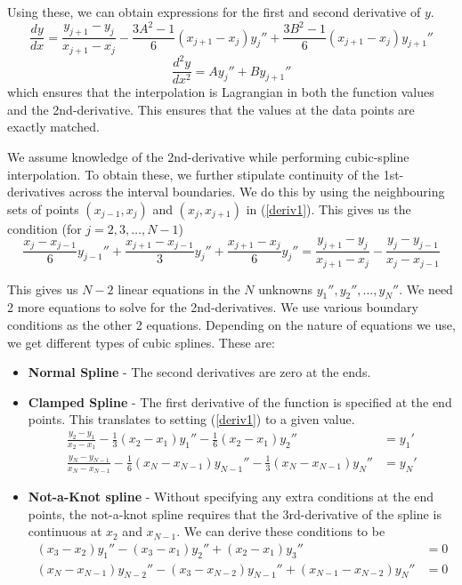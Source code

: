 \documentclass[11pt]{article}
\begin{document}
Using these, we can obtain expressions for the first and second derivative of $y$.
\begin{equation}
   \frac{dy}{dx} = \frac{y_{j+1}-y_{j}}{x_{j+1}-x_{j}} - \frac{3A^2-1}{6}(x_{j+1}-x_{j})y_{j}'' + \frac{3B^2-1}{6}(x_{j+1}-x_{j})y_{j+1}''
   \label{deriv1}
   \end{equation}   
\begin{equation}
\frac{d^2y}{dx^2} = Ay_{j}'' + By_{j+1}''
\end{equation}
which ensures that the interpolation is Lagrangian in both the function values and the 2nd-derivative. This ensures that the values at the data points are exactly matched. 

We assume knowledge of the 2nd-derivative while performing cubic-spline interpolation. To obtain these, we further stipulate continuity of the 1st-derivatives across the interval boundaries. We do this by using the neighbouring sets of points $(x_{j-1},x_{j})$ and $(x_{j},x_{j+1})$ in (\ref{deriv1}). This gives us the condition (for $j=2,3,\ldots,N-1$)
\begin{equation}
\frac{x_{j}-x_{j-1}}{6}y_{j-1}'' + \frac{x_{j+1}-x_{j-1}}{3}y_{j}'' + \frac{x_{j+1}-x_{j}}{6}y_{j}'' = \frac{y_{j+1}-y_{j}}{x_{j+1}-x_{j}} - \frac{y_{j}-y_{j-1}}{x_{j}-x_{j-1}}
\end{equation}

This gives us $N-2$ linear equations in the $N$ unknowns $y_{1}'',y_{2}'',\ldots,y_{N}''$. We need 2 more equations to solve for the 2nd-derivatives. We use various boundary conditions as the other 2 equations. Depending on the nature of equations we use, we get different types of cubic splines. These are:
\begin{itemize}
\item \textbf{Normal Spline} - The second derivatives are zero at the ends.

\item \textbf{Clamped Spline} - The first derivative of the function is specified at the end points. This translates to setting (\ref{deriv1}) to a given value. 
\begin{equation}
\begin{split}
\frac{y_{2}-y_{1}}{x_{2}-x_{1}} - \frac{1}{3}(x_{2}-x_{1})y_{1}'' - \frac{1}{6}(x_{2}-x_{1})y_2'' &= y_1' \\
\frac{y_{N}-y_{N-1}}{x_{N}-x_{N-1}} - \frac{1}{6}(x_{N}-x_{N-1})y_{N-1}'' - \frac{1}{3}(x_{N}-x_{N-1})y_{N}'' &=y_N'
\end{split}
\end{equation}
\item \textbf{Not-a-Knot spline} - Without specifying any extra conditions at the end points, the not-a-knot spline requires that the 3rd-derivative of the spline is continuous at $x_2$ and $x_{N-1}$. We can derive these conditions to be 
\begin{equation}
\begin{split}
(x_3-x_2)y_1'' - (x_3-x_1)y_2'' + (x_2-x_1)y_3'' &= 0 \\
(x_N-x_{N-1})y_{N-2}'' - (x_3-x_{N-2})y_{N-1}'' + (x_{N-1}-x_{N-2})y_N'' &= 0
\end{split}
\end{equation}
\end{itemize}
\end{document}
